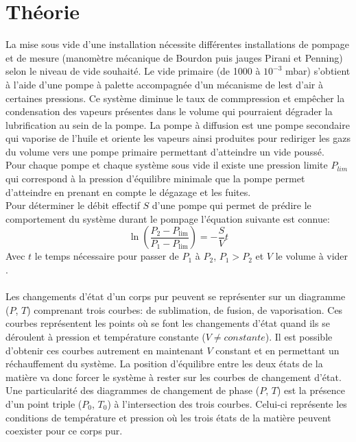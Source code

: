 \section{Théorie}

La mise sous vide d'une installation nécessite différentes installations de pompage et de mesure (manomètre mécanique de Bourdon puis jauges Pirani et Penning) selon le niveau de vide souhaité. Le vide primaire (de 1000 à \(10^{-3}\) \si{\milli \bar}) s'obtient à l'aide d'une pompe à palette accompagnée d'un mécanisme de lest d'air à certaines pressions. Ce système diminue le taux de commpression et empêcher la condensation des vapeurs présentes dans le volume qui pourraient dégrader la lubrification au sein de la pompe. La pompe à diffusion est une pompe secondaire qui vaporise de l'huile et oriente les vapeurs ainsi produites pour rediriger les gazs du volume vers une pompe primaire permettant d'atteindre un vide poussé. \\
Pour chaque pompe et chaque système sous vide il existe une pression limite \(P_{lim}\) qui correspond à la pression d'équilibre minimale que la pompe permet d'atteindre en prenant en compte le dégazage et les fuites. \\
Pour déterminer le débit effectif \(S\) d'une pompe qui permet de prédire le comportement du système durant le pompage l'équation suivante est connue:
\begin{equation}
    \ln(\frac{P_\textrm{2} - P_\textrm{lim}}{P_\textrm{1} - P_\textrm{lim}}) = -\frac{S}{V}t
    \label{eq:cinetique}
\end{equation}
Avec \(t\) le temps nécessaire pour passer de \(P_\textrm{1}\) à \(P_\textrm{2}\), \(P_\textrm{1} > P_\textrm{2}\) et \(V\) le volume à vider \cite{notice}. \\
\\
Les changements d'état d'un corps pur peuvent se représenter sur un diagramme (\(P\), \(T\)) comprenant trois courbes: de sublimation, de fusion, de vaporisation. Ces courbes représentent les points où se font les changements d'état quand ils se déroulent à pression et température constante (\(V \neq constante\)). Il est possible d'obtenir ces courbes autrement en maintenant \(V\) constant et en permettant un réchauffement du système. La position d'équilibre entre les deux états de la matière va donc forcer le système à rester sur les courbes de changement d'état. \\
Une particularité des diagrammes de changement de phase (\(P\), \(T\)) est la présence d'un point triple (\(P_0\), \(T_0\)) à l'intersection des trois courbes. Celui-ci représente les conditions de température et pression où les trois états de la matière peuvent coexister pour ce corps pur.\\
